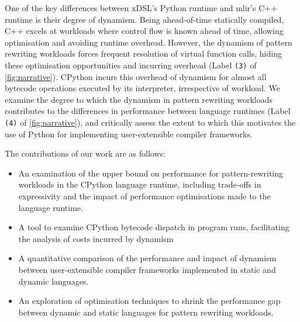 One of the key differences between xDSL's Python runtime and \ac{mlir}'s C++ runtime is their degree of dynamism.
Being ahead-of-time statically compiled, C++ excels at workloads where control flow is known ahead of time, allowing optimisation and avoiding runtime overhead. However, the dynamism of pattern rewriting workloads forces frequent resolution of virtual function calls, hiding these optimisation opportunities and incurring overhead (Label \texttt{(3)} of \autoref{fig:narrative}).
CPython incurs this overhead of dynamism for almost all bytecode operations executed by its interpreter, irrespective of workload.
We examine the degree to which the dynamism in pattern rewriting workloads contributes to the differences in performance between language runtimes (Label \texttt{(4)} of \autoref{fig:narrative}), and critically assess the extent to which this motivates the use of Python for implementing user-extensible compiler frameworks.



The contributions of our work are as follows:

\begin{itemize}
    \item An examination of the upper bound on performance for pattern-rewriting workloads in the CPython language runtime, including trade-offs in expressivity and the impact of performance optimisations made to the language runtime.
    \item A tool to examine CPython bytecode dispatch in program runs, facilitating the analysis of costs incurred by dynamism 
    \item A quantitative comparison of the performance and impact of dynamism between user-extensible compiler frameworks implemented in static and dynamic languages.
    \item An exploration of optimisation techniques to shrink the performance gap between dynamic and static languages for pattern rewriting workloads.
\end{itemize}



